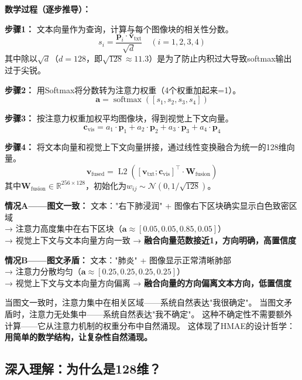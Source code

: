 \documentclass[11pt,a4paper]{ctexart}
\DeclareMathOperator{\softmax}{softmax}
\DeclareMathOperator{\Ltwo}{L2}
\begin{document}
\textbf{数学过程（逐步推导）：}

\textbf{步骤1：} 文本向量作为查询，计算与每个图像块的相关性分数。
$$s_i = \frac{\mathbf{p}_i \cdot \mathbf{v}_{\text{txt}}}{\sqrt{d}} \quad (i=1,2,3,4)$$
其中除以$\sqrt{d}$（$d=128$，即$\sqrt{128} \approx 11.3$）是为了防止内积过大导致softmax输出过于尖锐。

\textbf{步骤2：} 用Softmax将分数转为注意力权重（4个权重加起来=1）。
$$\mathbf{a} = \softmax([s_1, s_2, s_3, s_4])$$

\textbf{步骤3：} 按注意力权重加权平均图像块，得到视觉上下文向量。
$$\mathbf{c}_{\text{vis}} = a_1 \cdot \mathbf{p}_1 + a_2 \cdot \mathbf{p}_2 + a_3 \cdot \mathbf{p}_3 + a_4 \cdot \mathbf{p}_4$$

\textbf{步骤4：} 将文本向量和视觉上下文向量拼接，通过线性变换融合为统一的128维向量。
$$\mathbf{v}_{\text{fused}} = \Ltwo\left([\mathbf{v}_{\text{txt}}; \mathbf{c}_{\text{vis}}]^\top \cdot \mathbf{W}_{\text{fusion}}\right)$$
其中$\mathbf{W}_{\text{fusion}} \in \mathbb{R}^{256 \times 128}$，初始化为$w_{ij} \sim \mathcal{N}(0, 1/\sqrt{128})$。

\begin{exambox}
\textbf{情况A——图文一致：}
文本："右下肺浸润" + 图像右下区块确实显示白色致密区域\\
→ 注意力高度集中在右下区块（$\mathbf{a} \approx [0.05, 0.05, 0.85, 0.05]$）\\
→ 视觉上下文与文本向量方向一致 → \textbf{融合向量范数接近1，方向明确，高置信度}

\textbf{情况B——图文矛盾：}
文本："肺炎" + 图像显示正常清晰肺部\\
→ 注意力分散均匀（$\mathbf{a} \approx [0.25, 0.25, 0.25, 0.25]$）\\
→ 视觉上下文与文本向量方向偏离 → \textbf{融合向量的方向偏离文本方向，低置信度}
\end{exambox}

\begin{keybox}
当图文一致时，注意力集中在相关区域——系统自然表达"我很确定"。
当图文矛盾时，注意力无处集中——系统自然表达"我不确定"。
这种不确定性不需要额外计算——它从注意力机制的权重分布中自然涌现。
这体现了HMAE的设计哲学：\textbf{用简单的数学结构，让复杂性自然涌现。}
\end{keybox}

\subsection{深入理解：为什么是128维？}
\end{document}

